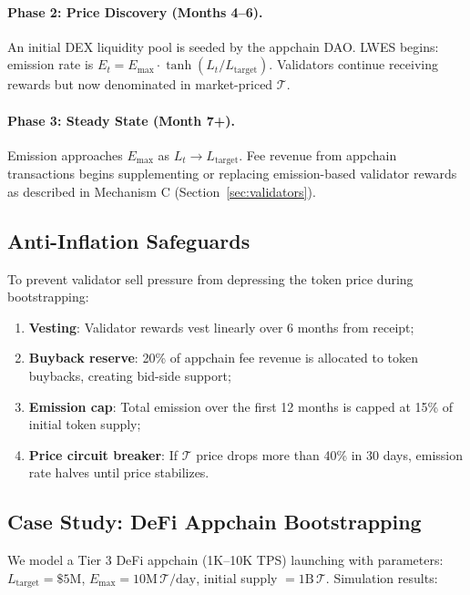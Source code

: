 \paragraph{Phase 2: Price Discovery (Months 4--6).}
An initial DEX liquidity pool is seeded by the appchain DAO. LWES begins: emission rate
is $E_t = E_{\max} \cdot \tanh(L_t / L_{\text{target}})$. Validators continue receiving
rewards but now denominated in market-priced $\mathcal{T}$.

\paragraph{Phase 3: Steady State (Month 7+).}
Emission approaches $E_{\max}$ as $L_t \to L_{\text{target}}$. Fee revenue from appchain
transactions begins supplementing or replacing emission-based validator rewards as
described in Mechanism C (Section~\ref{sec:validators}).

\subsection{Anti-Inflation Safeguards}

To prevent validator sell pressure from depressing the token price during bootstrapping:

\begin{enumerate}[leftmargin=1.5em]
  \item \textbf{Vesting}: Validator rewards vest linearly over 6 months from receipt;
  \item \textbf{Buyback reserve}: 20\% of appchain fee revenue is allocated to token buybacks,
    creating bid-side support;
  \item \textbf{Emission cap}: Total emission over the first 12 months is capped at 15\%
    of initial token supply;
  \item \textbf{Price circuit breaker}: If $\mathcal{T}$ price drops more than 40\% in 30
    days, emission rate halves until price stabilizes.
\end{enumerate}

\subsection{Case Study: DeFi Appchain Bootstrapping}

We model a Tier 3 DeFi appchain (1K--10K TPS) launching with parameters:
$L_{\text{target}} = \$5\text{M}$, $E_{\max} = 10\text{M}\,\mathcal{T}/\text{day}$,
initial supply $= 1\text{B}\,\mathcal{T}$. Simulation results:

